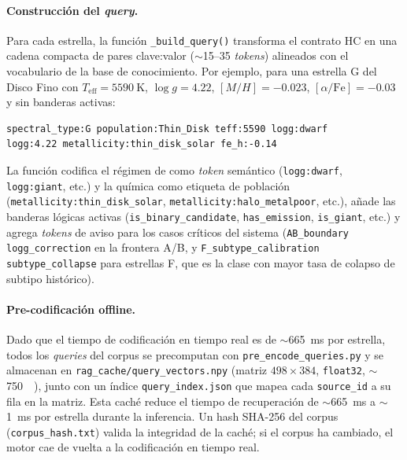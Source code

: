 \paragraph{Construcción del \emph{query}.} Para cada estrella, la función
\texttt{\_build\_query()} transforma el contrato HC en una cadena compacta de
pares clave:valor ($\sim$15--35 \emph{tokens}) alineados con el vocabulario de la
base de conocimiento. Por ejemplo, para una estrella G del Disco Fino con
$T_\mathrm{eff}=\SI{5590}{\kelvin}$, $\log g=4.22$, $[M/H]=-0.023$,
$[\alpha/\mathrm{Fe}]=-0.03$ y sin banderas activas:
\begin{verbatim}
spectral_type:G population:Thin_Disk teff:5590 logg:dwarf
logg:4.22 metallicity:thin_disk_solar fe_h:-0.14
\end{verbatim}
La función codifica el régimen de \logg{} como \emph{token} semántico
(\texttt{logg:dwarf}, \texttt{logg:giant}, etc.) y la química como etiqueta de
población (\texttt{metallicity:thin\_disk\_solar},
\texttt{metallicity:halo\_metalpoor}, etc.), añade las banderas lógicas activas
(\texttt{is\_binary\_candidate}, \texttt{has\_emission}, \texttt{is\_giant}, etc.)
y agrega \emph{tokens} de aviso para los casos críticos del sistema
(\texttt{AB\_boundary logg\_correction} en la frontera A/B, y
\texttt{F\_subtype\_calibration subtype\_collapse} para estrellas F, que es la
clase con mayor tasa de colapso de subtipo histórico).

\paragraph{Pre-codificación offline.} Dado que el tiempo de codificación en tiempo
real es de $\sim$\SI{665}{\milli\second} por estrella, todos los \emph{queries}
del corpus se precomputan con \texttt{pre\_encode\_queries.py} y se almacenan en
\texttt{rag\_cache/query\_vectors.npy} (matriz $498\times384$, \texttt{float32},
$\sim$\SI{750}{\kilo\byte}), junto con un índice \texttt{query\_index.json}
que mapea cada \texttt{source\_id} a su fila en la matriz. Esta caché reduce el
tiempo de recuperación de $\sim$\SI{665}{\milli\second} a $\sim$\SI{1}{\milli\second}
por estrella durante la inferencia. Un hash SHA-256 del corpus
(\texttt{corpus\_hash.txt}) valida la integridad de la caché; si el corpus ha
cambiado, el motor cae de vuelta a la codificación en tiempo real.

